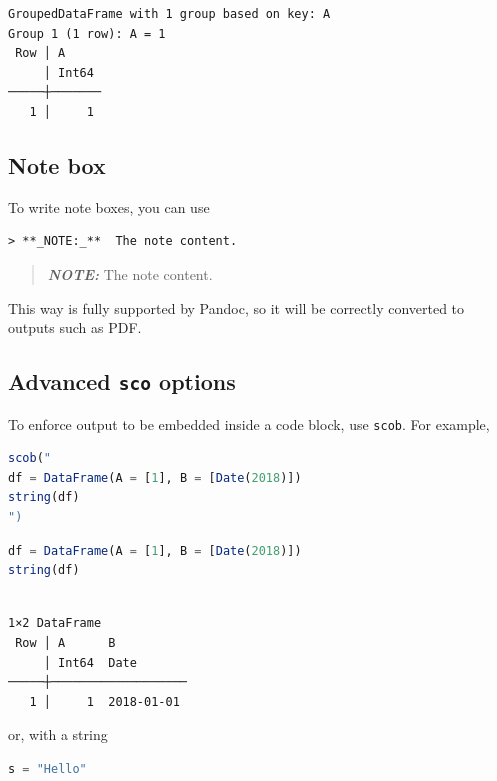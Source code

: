 \documentclass[
  notoc %
]{tufte-book}
\newcommand{\passthrough}[1]{#1}
\begin{document}
\begin{lstlisting}[language=Output]
GroupedDataFrame with 1 group based on key: A
Group 1 (1 row): A = 1
 Row │ A
     │ Int64
─────┼───────
   1 │     1
\end{lstlisting}

\hypertarget{note-box}{%
\subsection{Note box}\label{note-box}}

To write note boxes, you can use

\begin{lstlisting}
> **_NOTE:_**  The note content.
\end{lstlisting}

\begin{quote}
\textbf{\emph{NOTE:}} The note content.
\end{quote}

This way is fully supported by Pandoc, so it will be correctly converted
to outputs such as PDF.

\hypertarget{advanced-sco-options}{%
\subsection{\texorpdfstring{Advanced \texttt{sco}
options}{Advanced sco options}}\label{advanced-sco-options}}

To enforce output to be embedded inside a code block, use
\passthrough{\lstinline!scob!}. For example,

\begin{lstlisting}[language=Julia]
scob("
df = DataFrame(A = [1], B = [Date(2018)])
string(df)
")
\end{lstlisting}

\begin{lstlisting}[language=Julia]
df = DataFrame(A = [1], B = [Date(2018)])
string(df)
\end{lstlisting}

\begin{lstlisting}[language=Output]

1×2 DataFrame
 Row │ A      B
     │ Int64  Date
─────┼───────────────────
   1 │     1  2018-01-01

\end{lstlisting}

or, with a string

\begin{lstlisting}[language=Julia]
s = "Hello"
\end{lstlisting}
\end{document}
